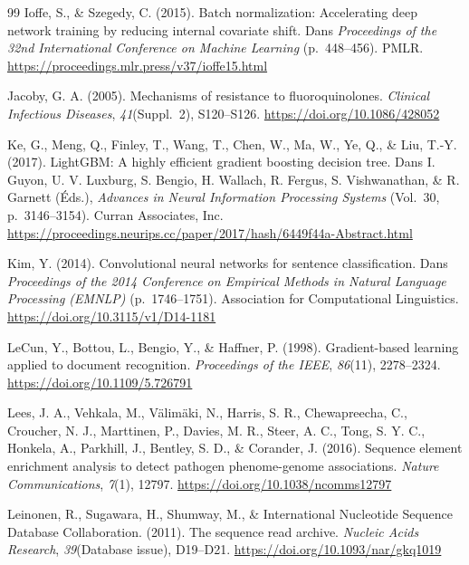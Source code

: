 \documentclass[11pt,a4paper]{article}
\begin{document}
\begin{thebibliography}{99}
Ioffe, S., \& Szegedy, C. (2015). Batch normalization: Accelerating deep network training by reducing internal covariate shift. Dans \textit{Proceedings of the 32nd International Conference on Machine Learning} (p.~448--456). PMLR. \url{https://proceedings.mlr.press/v37/ioffe15.html}

Jacoby, G. A. (2005). Mechanisms of resistance to fluoroquinolones. \textit{Clinical Infectious Diseases}, \textit{41}(Suppl.~2), S120--S126. \url{https://doi.org/10.1086/428052}

Ke, G., Meng, Q., Finley, T., Wang, T., Chen, W., Ma, W., Ye, Q., \& Liu, T.-Y. (2017). LightGBM: A highly efficient gradient boosting decision tree. Dans I. Guyon, U. V. Luxburg, S. Bengio, H. Wallach, R. Fergus, S. Vishwanathan, \& R. Garnett (Éds.), \textit{Advances in Neural Information Processing Systems} (Vol.~30, p.~3146--3154). Curran Associates, Inc. \url{https://proceedings.neurips.cc/paper/2017/hash/6449f44a-Abstract.html}

Kim, Y. (2014). Convolutional neural networks for sentence classification. Dans \textit{Proceedings of the 2014 Conference on Empirical Methods in Natural Language Processing (EMNLP)} (p.~1746--1751). Association for Computational Linguistics. \url{https://doi.org/10.3115/v1/D14-1181}

LeCun, Y., Bottou, L., Bengio, Y., \& Haffner, P. (1998). Gradient-based learning applied to document recognition. \textit{Proceedings of the IEEE}, \textit{86}(11), 2278--2324. \url{https://doi.org/10.1109/5.726791}

Lees, J. A., Vehkala, M., V{\"a}lim{\"a}ki, N., Harris, S. R., Chewapreecha, C., Croucher, N. J., Marttinen, P., Davies, M. R., Steer, A. C., Tong, S. Y. C., Honkela, A., Parkhill, J., Bentley, S. D., \& Corander, J. (2016). Sequence element enrichment analysis to detect pathogen phenome-genome associations. \textit{Nature Communications}, \textit{7}(1), 12797. \url{https://doi.org/10.1038/ncomms12797}

Leinonen, R., Sugawara, H., Shumway, M., \& International Nucleotide Sequence Database Collaboration. (2011). The sequence read archive. \textit{Nucleic Acids Research}, \textit{39}(Database issue), D19--D21. \url{https://doi.org/10.1093/nar/gkq1019}


\end{thebibliography}
\end{document}

